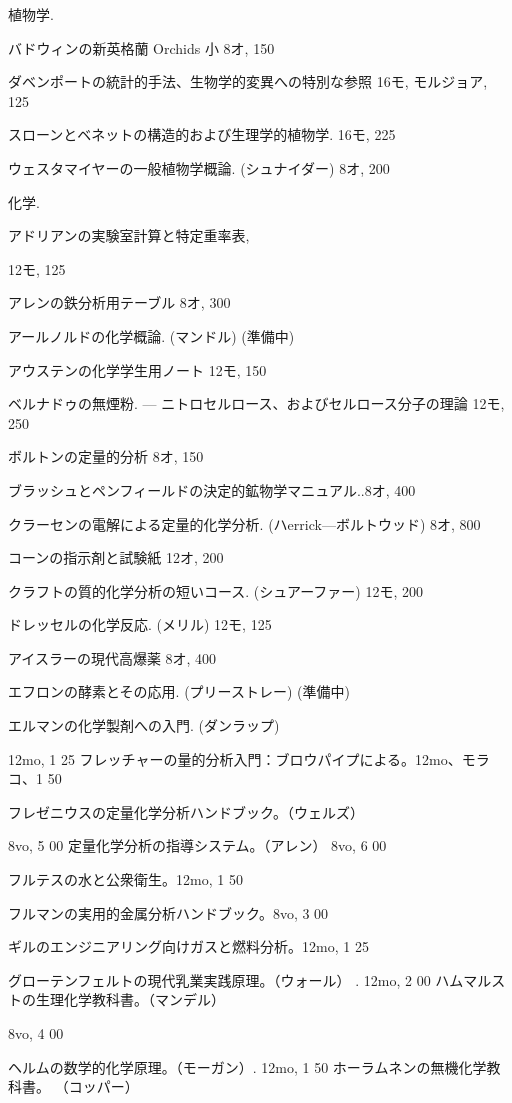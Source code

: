\documentclass[a4paper,11pt,openany]{ltjsbook}
\begin{document}
植物学.

バドウィンの新英格蘭 Orchids 小 8オ, 150

ダベンポートの統計的手法、生物学的変異への特別な参照 16モ, モルジョア, 125

スローンとベネットの構造的および生理学的植物学. 16モ, 225

ウェスタマイヤーの一般植物学概論. (シュナイダー) 8オ, 200

化学.

アドリアンの実験室計算と特定重率表,

12モ, 125

アレンの鉄分析用テーブル 8オ, 300

アールノルドの化学概論. (マンドル) (準備中)

アウステンの化学学生用ノート 12モ, 150

ベルナドゥの無煙粉. — ニトロセルロース、およびセルロース分子の理論 12モ, 250

ボルトンの定量的分析 8オ, 150

ブラッシュとペンフィールドの決定的鉱物学マニュアル..8オ, 400

クラーセンの電解による定量的化学分析. (ハerrick—ボルトウッド) 8オ, 800

コーンの指示剤と試験紙 12オ, 200

クラフトの質的化学分析の短いコース. (シュアーファー) 12モ, 200

ドレッセルの化学反応. (メリル) 12モ, 125

アイスラーの現代高爆薬 8オ, 400

エフロンの酵素とその応用. (プリーストレー) (準備中)

エルマンの化学製剤への入門. (ダンラップ)

12mo, 1 25 フレッチャーの量的分析入門：ブロウパイプによる。12mo、モラコ、1 50

フレゼニウスの定量化学分析ハンドブック。（ウェルズ）

8vo, 5 00 定量化学分析の指導システム。（アレン） 8vo, 6 00

フルテスの水と公衆衛生。12mo, 1 50

フルマンの実用的金属分析ハンドブック。8vo, 3 00

ギルのエンジニアリング向けガスと燃料分析。12mo, 1 25

グローテンフェルトの現代乳業実践原理。（ウォール） . 12mo, 2 00 ハムマルストの生理化学教科書。（マンデル）

8vo, 4 00

ヘルムの数学的化学原理。（モーガン）. 12mo, 1 50 ホーラムネンの無機化学教科書。 （コッパー）
\end{document}
